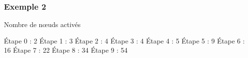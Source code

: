 \documentclass[12pt]{beamer}
\begin{document}
\begin{frame}
  \frametitle{Exemple 2}
  
  
  \begin{block}{Nombre de n\oe uds activés}
   \begin{overprint}
 Étape 0 : 2
 Étape 1 : 3
 Étape 2 : 4
 Étape 3 : 4
 Étape 4 : 5
 Étape 5 : 9
 Étape 6 : 16
 Étape 7 : 22
 Étape 8 : 34
 Étape 9 : 54
\end{overprint}
  \end{block}

  
  \begin{overlayarea}{8cm}{8cm}

\end{overlayarea}
\end{frame}
\end{document}
